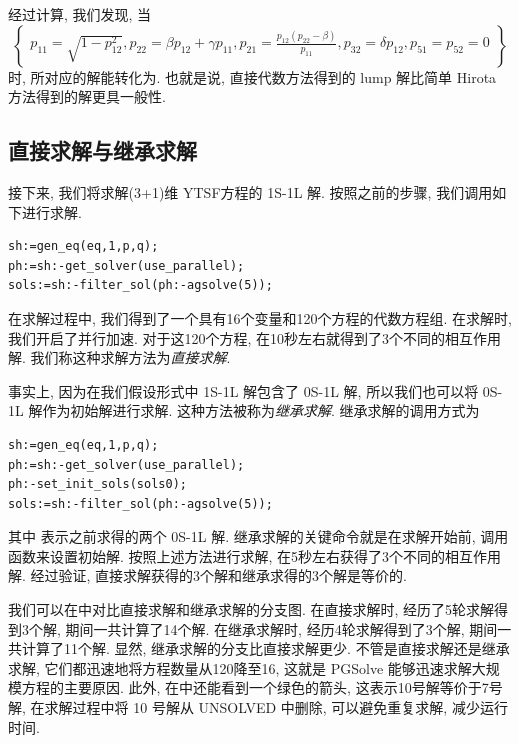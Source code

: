 经过计算, 我们发现, 当
\begin{equation}
\left\{ 
\begin{array}{l}
p_{11}=\sqrt{1-p_{12}^2},
p_{22}=\beta p_{12}+\gamma p_{11},
p_{21}=\frac{p_{12}(p_{22}-\beta)}{p_{11}},  
p_{32}=\delta p_{12},p_{51}=p_{52}=0
\end{array}
\right\}
\end{equation}
时, 所对应的解能转化为. 也就是说, 直接代数方法得到的 lump 解比简单 Hirota 方法得到的解更具一般性. 

\subsection{直接求解与继承求解}

接下来, 我们将求解(3+1)维 YTSF方程的 1S-1L 解. 按照之前的步骤, 我们调用如下进行求解. 
\begin{verbatim}
sh:=gen_eq(eq,1,p,q);
ph:=sh:-get_solver(use_parallel);
sols:=sh:-filter_sol(ph:-agsolve(5));
\end{verbatim}

在求解过程中, 我们得到了一个具有16个变量和120个方程的代数方程组. 在求解时, 我们开启了并行加速. 对于这120个方程, 在10秒左右就得到了3个不同的相互作用解. 我们称这种求解方法为\emph{直接求解}.

事实上, 因为在我们假设形式中 1S-1L 解包含了 0S-1L 解, 所以我们也可以将 0S-1L 解作为初始解进行求解. 这种方法被称为\emph{继承求解}. 继承求解的调用方式为
\begin{verbatim}
sh:=gen_eq(eq,1,p,q);
ph:=sh:-get_solver(use_parallel);
ph:-set_init_sols(sols0);
sols:=sh:-filter_sol(ph:-agsolve(5));
\end{verbatim}
其中 表示之前求得的两个 0S-1L 解. 继承求解的关键命令就是在求解开始前, 调用函数来设置初始解. 按照上述方法进行求解, 在5秒左右获得了3个不同的相互作用解. 经过验证, 直接求解获得的3个解和继承求得的3个解是等价的.

我们可以在中对比直接求解和继承求解的分支图. 在直接求解时, 经历了5轮求解得到3个解, 期间一共计算了14个解. 在继承求解时, 经历4轮求解得到了3个解, 期间一共计算了11个解. 显然, 继承求解的分支比直接求解更少. 不管是直接求解还是继承求解, 它们都迅速地将方程数量从120降至16, 这就是 PGSolve 能够迅速求解大规模方程的主要原因. 此外, 在中还能看到一个绿色的箭头, 这表示10号解等价于7号解, 在求解过程中将 10 号解从 UNSOLVED 中删除, 可以避免重复求解, 减少运行时间. 

